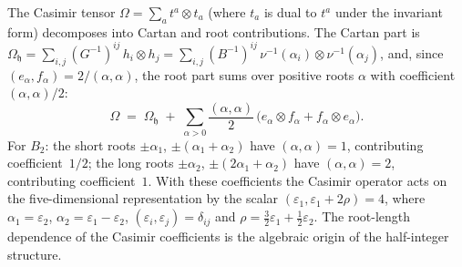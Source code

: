 \begin{computation}
The Casimir tensor $\Omega = \sum_{a} t^a \otimes t_a$
(where $t_a$ is dual to $t^a$ under the invariant form) decomposes
into Cartan and root contributions. The Cartan part
is $\Omega_{\mathfrak{h}} = \sum_{i,j} (G^{-1})^{ij}\,
h_i \otimes h_j = \sum_{i,j} (B^{-1})^{ij}\,
\nu^{-1}(\alpha_i) \otimes \nu^{-1}(\alpha_j)$, and, since
$(e_\alpha, f_\alpha) = 2/(\alpha,\alpha)$, the root part sums
over positive roots $\alpha$ with coefficient
$(\alpha, \alpha)/2$:
\begin{equation}\label{eq:BCD-casimir-decomposition}
 \Omega
 \;=\;
 \Omega_{\mathfrak{h}}
 \;+\;
 \sum_{\alpha > 0}
 \frac{(\alpha,\alpha)}{2}\,
 \bigl(e_\alpha \otimes f_\alpha + f_\alpha \otimes e_\alpha\bigr).
\end{equation}
For $B_2$: the short roots $\pm\alpha_1$, $\pm(\alpha_1 + \alpha_2)$
have $(\alpha,\alpha) = 1$, contributing coefficient~$1/2$;
the long roots $\pm\alpha_2$, $\pm(2\alpha_1 + \alpha_2)$
have $(\alpha,\alpha) = 2$, contributing coefficient~$1$.
With these coefficients the Casimir operator acts on the
five-dimensional representation by the scalar
$(\varepsilon_1, \varepsilon_1 + 2\rho) = 4$, where
$\alpha_1 = \varepsilon_2$, $\alpha_2 = \varepsilon_1 - \varepsilon_2$,
$(\varepsilon_i, \varepsilon_j) = \delta_{ij}$ and
$\rho = \tfrac32\varepsilon_1 + \tfrac12\varepsilon_2$.
The root-length dependence of the Casimir coefficients
is the algebraic origin of the half-integer structure.


\end{computation}
